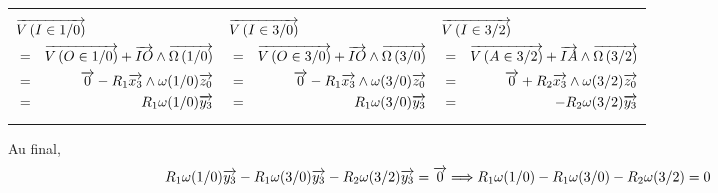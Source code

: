 \documentclass[10pt,oneside]{article}
\begin{document}
\begin{tabular}{p{}|p{}|p{}}
\begin{eqnarray*}
\lefteqn{\vectv{I}{1}{0}} \\
&=& \vectv{O}{1}{0} + \vect{IO} \wedge \vecto{1}{0} \\
&=& \vect{0} -R_1\vect{x_3}\wedge\omega(1/0)\vect{z_0} \\
&=& R_1 \omega(1/0)\vect{y_3} 
\end{eqnarray*}&
\begin{eqnarray*}
\lefteqn{\vectv{I}{3}{0}} \\
&= &\vectv{O}{3}{0} + \vect{IO} \wedge \vecto{3}{0} \\
&= &\vect{0} -R_1\vect{x_3}\wedge\omega(3/0)\vect{z_0} \\
&=&  R_1 \omega(3/0)\vect{y_3} 
\end{eqnarray*}&
\begin{eqnarray*}
\lefteqn{\vectv{I}{3}{2}} \\
&=& \vectv{A}{3}{2} + \vect{IA} \wedge \vecto{3}{2} \\
&=& \vect{0} + R_2\vect{x_3}\wedge\omega(3/2)\vect{z_0} \\
&=& -R_2 \omega(3/2)\vect{y_3} 
\end{eqnarray*}
\end{tabular}

\vspace{.25cm}

Au final, 
$$
R_1 \omega(1/0)\overrightarrow{y_3}  -R_1 \omega(3/0)\overrightarrow{y_3}  -R_2 \omega(3/2)\overrightarrow{y_3} = \overrightarrow{0}
\Longrightarrow
R_1 \omega(1/0) -R_1 \omega(3/0)  -R_2 \omega(3/2) = 0
$$
\end{document}
